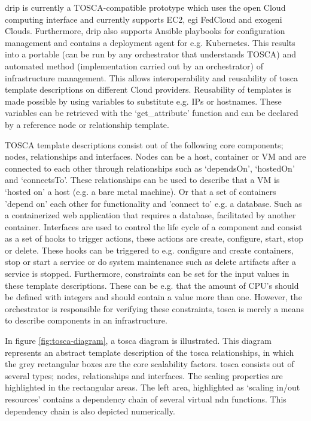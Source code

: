 \documentclass[conference]{IEEEtran}
\begin{document}
\gls{drip} is currently a TOSCA-compatible prototype which uses the open Cloud computing interface and currently supports EC2, \gls{egi} FedCloud and \gls{exogeni} Clouds. Furthermore, \gls{drip} also supports Ansible playbooks for configuration management and contains a deployment agent for e.g. Kubernetes. This results into a portable (can be run by any orchestrator that understands TOSCA) and automated method (implementation carried out by an orchestrator) of infrastructure management. This allows interoperability and reusability of \gls{tosca} template descriptions on different Cloud providers. Reusability of templates is made possible by using variables to substitute e.g. IPs or hostnames. These variables can be retrieved with the `get\_attribute' function and can be declared by a reference node or relationship template.

TOSCA template descriptions consist out of the following core components; nodes, relationships and interfaces. Nodes can be a host, container or VM and are connected to each other through relationships such as `dependsOn', `hostedOn' and `connectsTo'. These relationships can be used to describe that a VM is `hosted on' a host (e.g. a bare metal machine). Or that a set of containers 'depend on' each other for functionality and 'connect to' e.g. a database. Such as a containerized web application that requires a database, facilitated by another container. Interfaces are used to control the life cycle of a component and consist as a set of hooks to trigger actions, these actions are create, configure, start, stop or delete. These hooks can be triggered to e.g. configure and create containers, stop or start a service or do system maintenance such as delete artifacts after a service is stopped. Furthermore, constraints can be set for the input values in these template descriptions. These can be e.g. that the amount of CPU's should be defined with integers and should contain a value more than one. However, the orchestrator is responsible for verifying these constraints, \gls{tosca} is merely a means to describe components in an infrastructure.

In figure \ref{fig:tosca-diagram}, a \gls{tosca} diagram is illustrated. This diagram represents an abstract template description of the \gls{tosca} relationships, in which the grey rectangular boxes are the core scalability factors. \gls{tosca} consists out of several types; nodes, relationships and interfaces. The scaling properties are highlighted in the rectangular areas. The left area, highlighted as `scaling in/out resources' contains a dependency chain of several virtual \gls{ndn} functions. This dependency chain is also depicted numerically.
\end{document}

